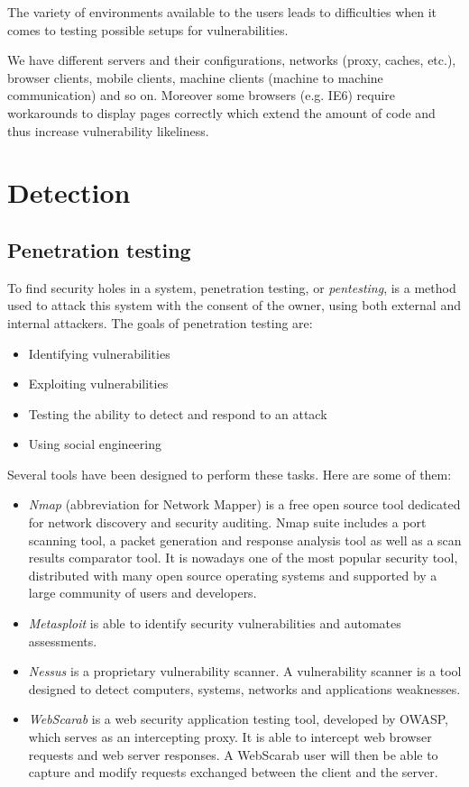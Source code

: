 The variety of environments available to the users leads to
difficulties when it comes to testing possible setups for
vulnerabilities.

We have different servers and their configurations, networks (proxy, caches,
etc.), browser clients, mobile clients, machine clients (machine to machine
communication) and so on.
Moreover some browsers (e.g. IE6) require workarounds to
display pages correctly which extend the amount of code and thus
increase vulnerability likeliness.

\section{Detection}

\subsection{Penetration testing}

To find security holes in a system, penetration testing, or \emph{pentesting}, is a
method used to attack this system with the consent of the owner, using both
external and internal attackers. The goals of penetration testing are:
\begin{itemize}
\item Identifying vulnerabilities
\item Exploiting vulnerabilities
\item Testing the ability to detect and respond to an attack
\item Using social engineering
\end{itemize}

Several tools have been designed to perform these tasks.
Here are some of them:
\begin{itemize}
\item \textit{Nmap} (abbreviation for Network Mapper) is a free open source tool
	dedicated for network discovery and security auditing. Nmap suite includes
	a port scanning tool, a packet generation and response analysis tool as
	well as a scan results comparator tool.  It is nowadays one of the most
	popular security tool, distributed with many open source operating systems
	and supported by a large community of users and developers.
\item \textit{Metasploit} is able to identify security vulnerabilities and
	automates assessments.
\item \textit{Nessus} is a proprietary vulnerability scanner. A vulnerability
	scanner is a tool designed to detect computers, systems, networks and
	applications weaknesses.
\item \textit{WebScarab} is a web security application testing tool, developed
	by OWASP, which serves as an intercepting proxy.
	It is able to intercept web browser requests and web server
	responses. A WebScarab user will then be able to capture and modify
	requests exchanged between the client and the server.
\end{itemize}

